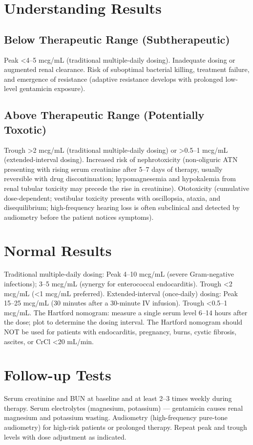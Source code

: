 \section*{Understanding Results}

\subsection*{Below Therapeutic Range (Subtherapeutic)}
Peak <4--5 mcg/mL (traditional multiple-daily dosing). Inadequate dosing or augmented renal clearance. Risk of suboptimal bacterial killing, treatment failure, and emergence of resistance (adaptive resistance develops with prolonged low-level gentamicin exposure).

\subsection*{Above Therapeutic Range (Potentially Toxotic)}
Trough >2 mcg/mL (traditional multiple-daily dosing) or >0.5--1 mcg/mL (extended-interval dosing). Increased risk of nephrotoxicity (non-oliguric ATN presenting with rising serum creatinine after 5--7 days of therapy, usually reversible with drug discontinuation; hypomagnesemia and hypokalemia from renal tubular toxicity may precede the rise in creatinine). Ototoxicity (cumulative dose-dependent; vestibular toxicity presents with oscillopsia, ataxia, and disequilibrium; high-frequency hearing loss is often subclinical and detected by audiometry before the patient notices symptoms).

\section*{Normal Results}
Traditional multiple-daily dosing: Peak 4--10 mcg/mL (severe Gram-negative infections); 3--5 mcg/mL (synergy for enterococcal endocarditis). Trough <2 mcg/mL (<1 mcg/mL preferred). Extended-interval (once-daily) dosing: Peak 15--25 mcg/mL (30 minutes after a 30-minute IV infusion). Trough <0.5--1 mcg/mL. The Hartford nomogram: measure a single serum level 6--14 hours after the dose; plot to determine the dosing interval. The Hartford nomogram should NOT be used for patients with endocarditis, pregnancy, burns, cystic fibrosis, ascites, or CrCl <20 mL/min.

\section*{Follow-up Tests}
Serum creatinine and BUN at baseline and at least 2--3 times weekly during therapy. Serum electrolytes (magnesium, potassium) --- gentamicin causes renal magnesium and potassium wasting. Audiometry (high-frequency pure-tone audiometry) for high-risk patients or prolonged therapy. Repeat peak and trough levels with dose adjustment as indicated.

